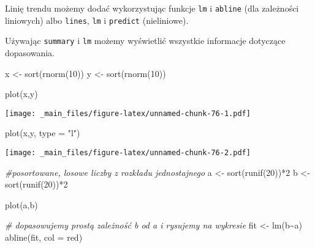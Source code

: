 \documentclass[
]{book}
\newenvironment{Shaded}{\begin{snugshade}}{\end{snugshade}}
\newcommand{\AttributeTok}[1]{\textcolor[rgb]{0.77,0.63,0.00}{#1}}
\newcommand{\CommentTok}[1]{\textcolor[rgb]{0.56,0.35,0.01}{\textit{#1}}}
\newcommand{\DecValTok}[1]{\textcolor[rgb]{0.00,0.00,0.81}{#1}}
\newcommand{\FunctionTok}[1]{\textcolor[rgb]{0.00,0.00,0.00}{#1}}
\newcommand{\NormalTok}[1]{#1}
\newcommand{\OtherTok}[1]{\textcolor[rgb]{0.56,0.35,0.01}{#1}}
\newcommand{\SpecialCharTok}[1]{\textcolor[rgb]{0.00,0.00,0.00}{#1}}
\newcommand{\StringTok}[1]{\textcolor[rgb]{0.31,0.60,0.02}{#1}}
\begin{document}
Linię trendu możemy dodać wykorzystując funkcje \texttt{lm} i \texttt{abline} (dla zależności liniowych) albo \texttt{lines}, \texttt{lm} i \texttt{predict} (nieliniowe).

Używając \texttt{summary} i \texttt{lm} możemy wyświetlić wszystkie informacje dotyczące dopasowania.

\begin{Shaded}
\begin{Highlighting}[]
\NormalTok{x }\OtherTok{\textless{}{-}} \FunctionTok{sort}\NormalTok{(}\FunctionTok{rnorm}\NormalTok{(}\DecValTok{10}\NormalTok{))}
\NormalTok{y }\OtherTok{\textless{}{-}} \FunctionTok{sort}\NormalTok{(}\FunctionTok{rnorm}\NormalTok{(}\DecValTok{10}\NormalTok{))}

\FunctionTok{plot}\NormalTok{(x,y)}
\end{Highlighting}
\end{Shaded}

\texttt{[image: \_main\_files/figure-latex/unnamed-chunk-76-1.pdf]}

\begin{Shaded}
\begin{Highlighting}[]
\FunctionTok{plot}\NormalTok{(x,y, }\AttributeTok{type =} \StringTok{"l"}\NormalTok{)}
\end{Highlighting}
\end{Shaded}

\texttt{[image: \_main\_files/figure-latex/unnamed-chunk-76-2.pdf]}

\begin{Shaded}
\begin{Highlighting}[]
\CommentTok{\#posortowane, losowe liczby z rozkładu jednostajnego}
\NormalTok{a }\OtherTok{\textless{}{-}} \FunctionTok{sort}\NormalTok{(}\FunctionTok{runif}\NormalTok{(}\DecValTok{20}\NormalTok{))}\SpecialCharTok{*}\DecValTok{2}
\NormalTok{b }\OtherTok{\textless{}{-}} \FunctionTok{sort}\NormalTok{(}\FunctionTok{runif}\NormalTok{(}\DecValTok{20}\NormalTok{))}\SpecialCharTok{*}\DecValTok{2}

\FunctionTok{plot}\NormalTok{(a,b)}

\CommentTok{\# dopasowujemy prostą zależność b od a i rysujemy na wykresie}
\NormalTok{fit }\OtherTok{\textless{}{-}} \FunctionTok{lm}\NormalTok{(b}\SpecialCharTok{\textasciitilde{}}\NormalTok{a)}
\FunctionTok{abline}\NormalTok{(fit, }\AttributeTok{col =} \StringTok{\textquotesingle{}red\textquotesingle{}}\NormalTok{)}
\end{Highlighting}
\end{Shaded}
\end{document}
